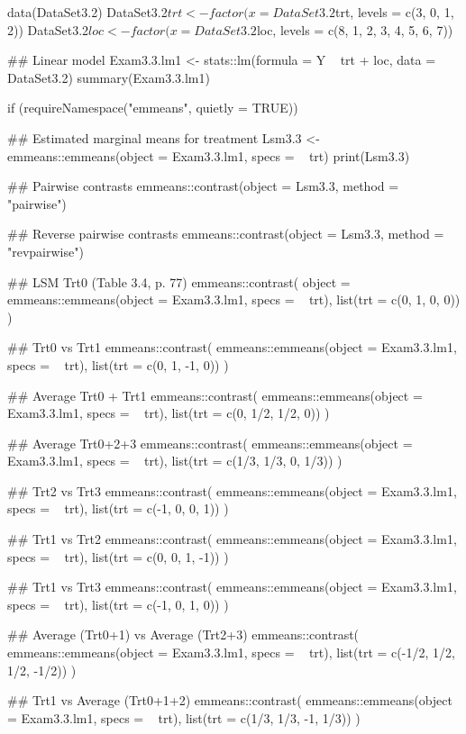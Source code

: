 \documentclass[a4paper]{book}
\begin{document}
\begin{Examples}
\begin{ExampleCode}
data(DataSet3.2)
DataSet3.2$trt <- factor(x = DataSet3.2$trt, levels = c(3, 0, 1, 2))
DataSet3.2$loc <- factor(x = DataSet3.2$loc, levels = c(8, 1, 2, 3, 4, 5, 6, 7))

## Linear model
Exam3.3.lm1 <- stats::lm(formula = Y ~ trt + loc, data = DataSet3.2)
summary(Exam3.3.lm1)

if (requireNamespace("emmeans", quietly = TRUE)) {
  ## Estimated marginal means for treatment
  Lsm3.3 <- emmeans::emmeans(object = Exam3.3.lm1, specs = ~ trt)
  print(Lsm3.3)

  ## Pairwise contrasts
  emmeans::contrast(object = Lsm3.3, method = "pairwise")

  ## Reverse pairwise contrasts
  emmeans::contrast(object = Lsm3.3, method = "revpairwise")

  ## LSM Trt0 (Table 3.4, p. 77)
  emmeans::contrast(
    object = emmeans::emmeans(object = Exam3.3.lm1, specs = ~ trt),
    list(trt = c(0, 1, 0, 0))
  )

  ## Trt0 vs Trt1
  emmeans::contrast(
    emmeans::emmeans(object = Exam3.3.lm1, specs = ~ trt),
    list(trt = c(0, 1, -1, 0))
  )

  ## Average Trt0 + Trt1
  emmeans::contrast(
    emmeans::emmeans(object = Exam3.3.lm1, specs = ~ trt),
    list(trt = c(0, 1/2, 1/2, 0))
  )

  ## Average Trt0+2+3
  emmeans::contrast(
    emmeans::emmeans(object = Exam3.3.lm1, specs = ~ trt),
    list(trt = c(1/3, 1/3, 0, 1/3))
  )

  ## Trt2 vs Trt3
  emmeans::contrast(
    emmeans::emmeans(object = Exam3.3.lm1, specs = ~ trt),
    list(trt = c(-1, 0, 0, 1))
  )

  ## Trt1 vs Trt2
  emmeans::contrast(
    emmeans::emmeans(object = Exam3.3.lm1, specs = ~ trt),
    list(trt = c(0, 0, 1, -1))
  )

  ## Trt1 vs Trt3
  emmeans::contrast(
    emmeans::emmeans(object = Exam3.3.lm1, specs = ~ trt),
    list(trt = c(-1, 0, 1, 0))
  )

  ## Average (Trt0+1) vs Average (Trt2+3)
  emmeans::contrast(
    emmeans::emmeans(object = Exam3.3.lm1, specs = ~ trt),
    list(trt = c(-1/2, 1/2, 1/2, -1/2))
  )

  ## Trt1 vs Average (Trt0+1+2)
  emmeans::contrast(
    emmeans::emmeans(object = Exam3.3.lm1, specs = ~ trt),
    list(trt = c(1/3, 1/3, -1, 1/3))
  )
}
\end{ExampleCode}
\end{Examples}
\end{document}
